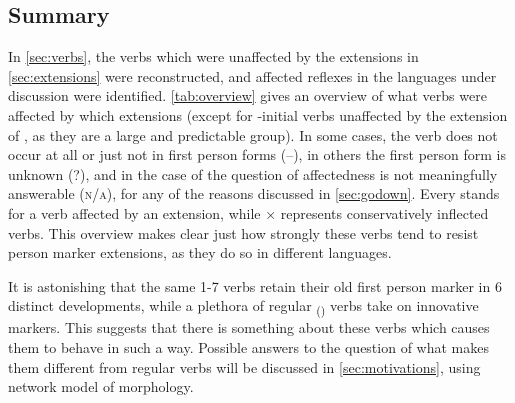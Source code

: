 


\subsection{Summary}
\label{sec:verbsummary}
In \cref{sec:verbs}, the verbs which were unaffected by the extensions in \cref{sec:extensions} were reconstructed, and affected reflexes in the languages under discussion were identified.
\cref{tab:overview} gives an overview of what verbs were affected by which extensions (except for -initial \akuriyo verbs unaffected by the extension of , as they are a large and predictable group).
In some cases, the verb does not occur at all or just not in first person forms (–), in others the first person form is unknown (?), and in the case of  the question of affectedness is not meaningfully answerable (\textsc{n/a}), for any of the reasons discussed in \cref{sec:godown}.
Every \checkmark stands for a verb affected by an extension, while × represents conservatively inflected verbs.
This overview makes clear just how strongly these verbs tend to resist person marker extensions, as they do so in different languages.



It is astonishing that the same 1-7 verbs retain their old first person marker in 6 distinct developments, while a plethora of regular \textsubscript{()} verbs take on innovative markers.
This suggests that there is something about these verbs which causes them to behave in such a way.
Possible answers to the question of what makes them different from regular  verbs will be discussed in \cref{sec:motivations}, using  network model of morphology.